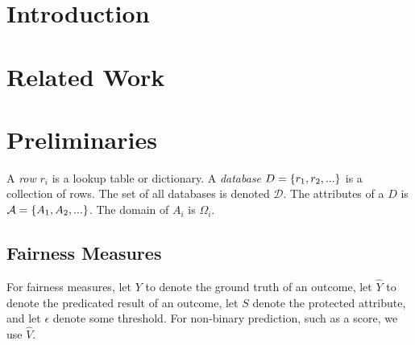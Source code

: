 \documentclass[acmsmall,sigconf]{acmart}
\DeclarePairedDelimiter{\set}{\{}{\}}
\newcommand{\db}{D}
\newcommand{\dbs}{\mathcal{D}}
\begin{document}



\maketitle

\section{Introduction}

\section{Related Work}

\clearpage

\section{Preliminaries}

A \emph{row} $r_i$ is a lookup table or dictionary. A \emph{database} $\db = \set{r_1, r_2, ...}$ is a collection of rows. The set of all databases is denoted $\dbs$. The attributes of a $\db$ is $\mathcal{A} = \set{A_1, A_2, ...}$. The domain of $A_i$ is $\Omega_i$.

\subsection{Fairness Measures}

For fairness measures\cite{yuan2024ensuring,pessach2022review}, let $Y$ to denote the ground truth of an outcome, let $\hat{Y}$ to denote the predicated result of an outcome, let $S$ denote the protected attribute, and let $\epsilon$ denote some threshold. For non-binary prediction, such as a score, we use $\hat{V}$.
\end{document}

